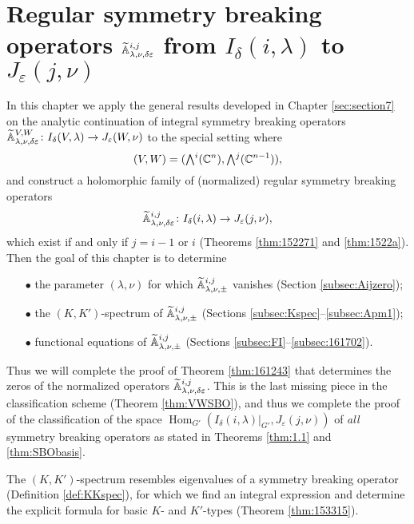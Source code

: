 \newpage
\section{Regular symmetry breaking operators
 ${\widetilde{\mathbb{A}}}_{{\lambda},{\nu},{\delta\varepsilon}}^{{i,j}}$ from $I_{\delta}(i,\lambda)$ to $J_{\varepsilon}(j,\nu)$}
\label{sec:holo}

In this chapter we apply the general results
 developed in Chapter \ref{sec:section7}
 on the analytic continuation
 of integral symmetry breaking operators
 ${\widetilde{\mathbb{A}}}_{{\lambda},{\nu},{\delta\varepsilon}}^{{V,W}} 
  \colon 
  I_{\delta}(V,\lambda) \to J_{\varepsilon}(W,\nu)$
 to the special setting where 
\begin{equation}
\label{eqn:VWexterior}
  (V,W)=(\Exterior^i({\mathbb{C}}^n), \Exterior^j({\mathbb{C}}^{n-1})), 
\end{equation}
 and construct a holomorphic family
 of (normalized) regular symmetry breaking operators
\[
  {\widetilde{\mathbb{A}}}_{{\lambda},{\nu},{\delta\varepsilon}}^{{i,j}}
  \colon 
   I_{\delta}(i,\lambda) \to J_{\varepsilon}(j,\nu), 
\]
 which exist if and only if $j=i-1$ or $i$
 (Theorems \ref{thm:152271} and \ref{thm:1522a}).  
Then the goal of this chapter 
 is to determine
\begin{enumerate}
\item[$\bullet$]
the parameter $(\lambda,\nu)$ 
for which ${\widetilde{\mathbb{A}}}_{{\lambda},{\nu},{\pm}}^{{i,j}}$ vanishes
 (Section \ref{subsec:Aijzero});
\item[$\bullet$]
the $(K,K')$-spectrum of ${\widetilde{\mathbb{A}}}_{{\lambda},{\nu},{\pm}}^{{i,j}}$
 (Sections \ref{subsec:Kspec}--\ref{subsec:Apm1});
\item[$\bullet$]
functional equations of ${\widetilde{\mathbb{A}}}_{{\lambda},{\nu},{\pm}}^{{i,j}}$
 (Sections \ref{subsec:FI}--\ref{subsec:161702}).  
\end{enumerate}
Thus we will complete the proof of Theorem \ref{thm:161243}
 that determines the zeros
 of the normalized operators
 ${\widetilde{\mathbb{A}}}_{{\lambda},{\nu},{\delta \varepsilon}}^{{i,j}}$.  
This is the last missing piece 
 in the classification scheme
 (Theorem \ref{thm:VWSBO}), 
 and thus we complete the proof of the classification
 of the space ${\operatorname{Hom}}_{G'}(I_{\delta}(i,\lambda)|_{G'}, J_{\varepsilon}(j,\nu))$ 
 of {\it{all}} symmetry breaking operators
 as stated in Theorems \ref{thm:1.1} and \ref{thm:SBObasis}.  



The $(K,K')$-spectrum resembles eigenvalues
 of a symmetry breaking operator
 (Definition \ref{def:KKspec}), 
 for which we find an integral expression 
 and determine the explicit formula
 for basic $K$- and $K'$-types
 (Theorem \ref{thm:153315}).  



